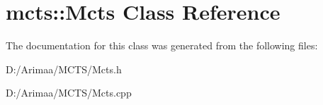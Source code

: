 \hypertarget{classmcts_1_1_mcts}{\section{mcts\+:\+:Mcts Class Reference}
\label{classmcts_1_1_mcts}
}


The documentation for this class was generated from the following files\+:\begin{DoxyCompactItemize}
\item 
D\+:/\+Arimaa/\+M\+C\+T\+S/Mcts.\+h\item 
D\+:/\+Arimaa/\+M\+C\+T\+S/Mcts.\+cpp\end{DoxyCompactItemize}
